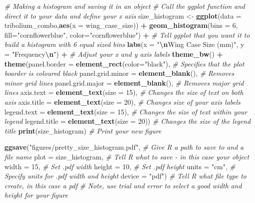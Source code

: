\documentclass[
]{book}
\newenvironment{Shaded}{\begin{snugshade}}{\end{snugshade}}
\newcommand{\AttributeTok}[1]{\textcolor[rgb]{0.13,0.29,0.53}{#1}}
\newcommand{\CommentTok}[1]{\textcolor[rgb]{0.56,0.35,0.01}{\textit{#1}}}
\newcommand{\DecValTok}[1]{\textcolor[rgb]{0.00,0.00,0.81}{#1}}
\newcommand{\FunctionTok}[1]{\textcolor[rgb]{0.13,0.29,0.53}{\textbf{#1}}}
\newcommand{\NormalTok}[1]{#1}
\newcommand{\OtherTok}[1]{\textcolor[rgb]{0.56,0.35,0.01}{#1}}
\newcommand{\SpecialCharTok}[1]{\textcolor[rgb]{0.81,0.36,0.00}{\textbf{#1}}}
\newcommand{\StringTok}[1]{\textcolor[rgb]{0.31,0.60,0.02}{#1}}
\begin{document}
\begin{Shaded}
\begin{Highlighting}[]
\CommentTok{\# Making a histogram and saving it in an object}
\CommentTok{\# Call the ggplot function and direct it to your data and define your x axis}
\NormalTok{size\_histogram }\OtherTok{\textless{}{-}} \FunctionTok{ggplot}\NormalTok{(}\AttributeTok{data =}\NormalTok{ tribolium\_combo,}\FunctionTok{aes}\NormalTok{(}\AttributeTok{x =}\NormalTok{ wing\_case\_size)) }\SpecialCharTok{+} 
  \FunctionTok{geom\_histogram}\NormalTok{(}\AttributeTok{bins =} \DecValTok{6}\NormalTok{, }\AttributeTok{fill=}\StringTok{"cornflowerblue"}\NormalTok{, }\AttributeTok{color=}\StringTok{"cornflowerblue"}\NormalTok{) }\SpecialCharTok{+} \CommentTok{\# Tell ggplot that you want it to build a histogram with 6 equal sized bins}
  \FunctionTok{labs}\NormalTok{(}\AttributeTok{x =} \StringTok{"}\SpecialCharTok{\textbackslash{}n}\StringTok{Wing Case Size (mm)"}\NormalTok{, }\AttributeTok{y =} \StringTok{"Frequency}\SpecialCharTok{\textbackslash{}n}\StringTok{"}\NormalTok{) }\SpecialCharTok{+} \CommentTok{\# Adjust your x and y axis labels }
  \FunctionTok{theme\_bw}\NormalTok{() }\SpecialCharTok{+}
  \FunctionTok{theme}\NormalTok{(}\AttributeTok{panel.border =} \FunctionTok{element\_rect}\NormalTok{(}\AttributeTok{color=}\StringTok{"black"}\NormalTok{), }\CommentTok{\# Specifies that the plot boarder is coloured black}
        \AttributeTok{panel.grid.minor =} \FunctionTok{element\_blank}\NormalTok{(), }\CommentTok{\# Removes minor grid lines }
        \AttributeTok{panel.grid.major =} \FunctionTok{element\_blank}\NormalTok{(), }\CommentTok{\# Removes major grid lines }
        \AttributeTok{axis.text =} \FunctionTok{element\_text}\NormalTok{(}\AttributeTok{size =} \DecValTok{15}\NormalTok{), }\CommentTok{\# Changes the size of text on both axis }
        \AttributeTok{axis.title =} \FunctionTok{element\_text}\NormalTok{(}\AttributeTok{size =} \DecValTok{20}\NormalTok{), }\CommentTok{\# Changes size of your axis labels }
        \AttributeTok{legend.text =} \FunctionTok{element\_text}\NormalTok{(}\AttributeTok{size =} \DecValTok{15}\NormalTok{), }\CommentTok{\# Changes the size of text within your legend}
        \AttributeTok{legend.title =} \FunctionTok{element\_text}\NormalTok{(}\AttributeTok{size =} \DecValTok{20}\NormalTok{)) }\CommentTok{\# Changes the size of the legend title  }
\FunctionTok{print}\NormalTok{(size\_histogram) }\CommentTok{\# Print your new figure}

\FunctionTok{ggsave}\NormalTok{(}\StringTok{"figures/pretty\_size\_histogram.pdf"}\NormalTok{, }\CommentTok{\# Give R a path to save to and a file name}
       \AttributeTok{plot =}\NormalTok{ size\_histogram, }\CommentTok{\# Tell R what to save {-} in this case your object}
       \AttributeTok{width =} \DecValTok{15}\NormalTok{, }\CommentTok{\# Set .pdf width}
       \AttributeTok{height =} \DecValTok{10}\NormalTok{, }\CommentTok{\# Set .pdf height}
       \AttributeTok{units =} \StringTok{"cm"}\NormalTok{, }\CommentTok{\# Specify units for .pdf width and height}
       \AttributeTok{device =} \StringTok{"pdf"}\NormalTok{) }\CommentTok{\# Tell R what file type to create, in this case a pdf}
\CommentTok{\# Note, use trial and error to select a good width and height for your figure}


\end{Highlighting}
\end{Shaded}
\end{document}
